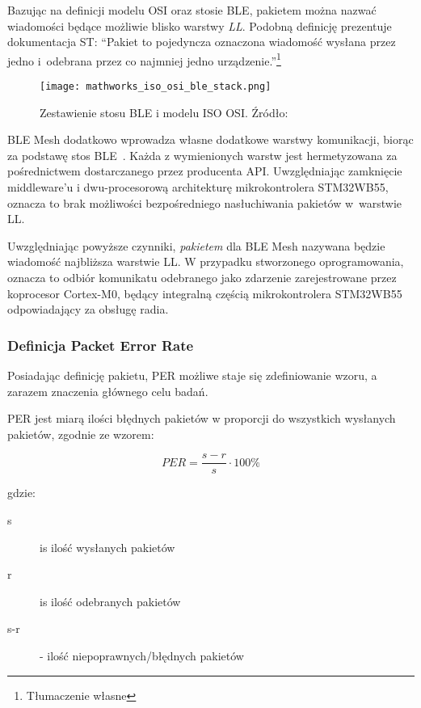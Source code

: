 Bazując na definicji modelu OSI oraz stosie BLE, pakietem można nazwać wiadomości będące możliwie blisko
warstwy \textit{\gls{LL}}. Podobną definicję prezentuje dokumentacja ST:
\enquote{Pakiet to pojedyncza oznaczona wiadomość wysłana przez jedno i~odebrana przez 
co najmniej jedno urządzenie.}\footnote{Tłumaczenie własne}~\cite{stmicroelectronics_pm0271_2021}

\begin{figure}[!ht]
	\centering \texttt{[image: mathworks\_iso\_osi\_ble\_stack.png]} 
	\caption{Zestawienie stosu BLE i modelu ISO OSI. Źródło: \cite{noauthor_bluetooth_nodate}}
	\label{rys:agregacja_protokolow_ble}
\end{figure}

BLE Mesh dodatkowo wprowadza własne dodatkowe warstwy komunikacji, biorąc za podstawę stos BLE~\cite{mesh_working_group_mesh_2019}.
Każda z wymienionych warstw jest hermetyzowana za pośrednictwem dostarczanego przez producenta \gls{API}.
Uwzględniając zamknięcie middleware'u i dwu-procesorową architekturę mikrokontrolera STM32WB55, oznacza 
to brak możliwości bezpośredniego nasłuchiwania pakietów w~warstwie \gls{LL}.

Uwzględniając powyższe czynniki, \textit{pakietem} dla BLE Mesh nazywana będzie wiadomość najbliższa warstwie \gls{LL}.
W przypadku stworzonego oprogramowania, oznacza to odbiór komunikatu odebranego jako zdarzenie zarejestrowane przez
koprocesor Cortex-M0, będący integralną częścią mikrokontrolera STM32WB55 odpowiadający za obsługę radia.

\subsubsection{Definicja Packet Error Rate}
Posiadając definicję pakietu, \gls{PER} możliwe staje się zdefiniowanie wzoru, a zarazem znaczenia
głównego celu badań.

PER jest miarą ilości błędnych pakietów w proporcji do wszystkich wysłanych pakietów, zgodnie ze wzorem:

\begin{equation}
\label{per_equation}
PER = \frac{s - r}{s} \cdot 100\%
\end{equation}

gdzie:

\begin{description}
\item[s] is ilość wysłanych pakietów
\item[r] is ilość odebranych pakietów
\item[s-r] - ilość niepoprawnych/błędnych pakietów
\end{description}

